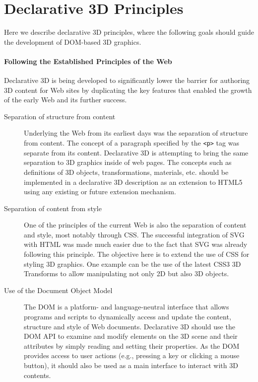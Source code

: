 \documentclass{acmsiggraph}
\begin{document}
\section{Declarative 3D Principles}
\label{sec:Principles}

Here we describe declarative 3D principles, where the following goals should guide the development of DOM-based 3D graphics.

\paragraph{Following the Established Principles of the Web}
Declarative 3D is being developed to significantly lower the barrier for authoring 3D content for Web sites by duplicating the key features that enabled the growth of the early Web and its further success.

\begin{description}
  \item [Separation of structure from content] Underlying the Web from its earliest days was the separation of structure from content. The concept of a paragraph specified by the \verb|<p>| tag was separate from its content. Declarative 3D is attempting to bring the same separation to 3D graphics inside of web pages. The concepts such as definitions of 3D objects, transformations, materials, etc. should be implemented in a declarative 3D description as an extension to HTML5 \cite{HTML5} using any existing or future extension mechanism.
  \item [Separation of content from style] One of the principles of the current Web is also the separation of content and style, most notably through CSS. The successful integration of SVG \cite{svg} with HTML was made much easier due to the fact that SVG was already following this principle. The objective here is to extend the use of CSS for styling 3D graphics. One example can be the use of the latest CSS3 3D Transforms \cite{webkit3DCSS} to allow manipulating not only 2D but also 3D objects.
  \item [Use of the Document Object Model] The DOM \cite{W3C-DOM} is a platform- and language-neutral interface that allows programs and scripts to dynamically access and update the content, structure and style of Web documents. Declarative 3D should use the DOM API to examine and modify elements on the 3D scene and their attributes by simply reading and setting their properties. As the DOM provides access to user actions (e.g., pressing a key or clicking a mouse button), it should also be used as a main interface to interact with 3D contents.
\end{description}
\end{document}
